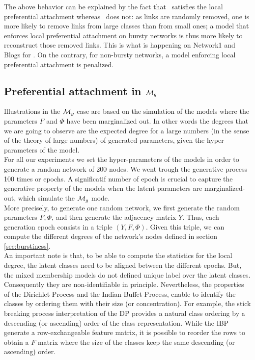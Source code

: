 The above behavior can be explained by the fact that \imb\ satisfies the local preferential attachment whereas \ifm\ does not: as links are randomly removed, one is more likely to remove links from large classes than from small ones; a model that enforces local preferential attachment on bursty networks is thus more likely to reconstruct those removed links. This is what is happening on Network1 and Blogs for \imb. On the contrary, for non-bursty networks, a model enforcing local preferential attachment is penalized.


\subsection{Preferential attachment in $\mathcal{M}_g$}

Illustrations in the $\mathcal{M}_g$ case are based on the simulation of the models where the parameters $F$ and $\Phi$ have been marginalized out. In other words the degrees that we are going to observe are the expected degree for a large numbers (in the sense of the theory of large numbers) of generated parameters, given the hyper-parameters of the model. ~\\

For all our experiments we set the hyper-parameters of the models in order to generate a random network of 200 nodes. We went trough the generative process 100 times or epochs. A significatif number of epoch is crucial to capture the generative property of the models when the latent parameters are marginalized-out, which simulate the $\mathcal{M}_g$ mode.~\\

More precisely, to generate one random network, we first generate the random parameters $F, \Phi$, and then generate the adjacency matrix $Y$. Thus, each generation epoch consists in a triple $(Y, F, \Phi)$. Given this triple, we can compute the different degrees of the network's nodes defined in section \ref{sec:burstiness}.~\\

An important note is that, to be able to compute the statistics for the local degree, the latent classes need to be aligned between the different epochs. But, the mixed membership models do not defined unique label over the latent classes. Consequently they are non-identifiable in principle. Nevertheless, the properties of the Dirichlet Process and the Indian Buffet Process, enable to identify the classes by ordering them with their size (or concentration). For example, the stick breaking process interpretation of the DP provides a natural class ordering by a descending (or ascending) order of the class representation. While the IBP generate a row-exchangeable feature matrix, it is possible to reorder the rows to obtain a $F$ matrix where the size of the classes keep the same descending (or ascending) order.~\\

